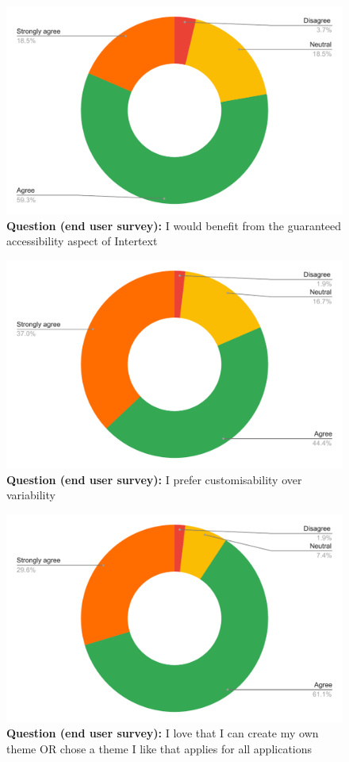 \begin{figure}[H]
  \centering
  \includegraphics[width=13cm]{thesis/paper/images/p2u_q5.pdf}
  \textbf{Question (end user survey):} I would benefit from the guaranteed accessibility aspect of Intertext
\end{figure}

\begin{figure}[H]
  \centering
  \includegraphics[width=13cm]{thesis/paper/images/p2u_q6.pdf}
  \textbf{Question (end user survey):} I prefer customisability over variability
\end{figure}

\begin{figure}[H]
  \centering
  \includegraphics[width=13cm]{thesis/paper/images/p2u_q7.pdf}
  \textbf{Question (end user survey):} I love that I can create my own theme OR chose a theme I like that applies for all applications
\end{figure}

